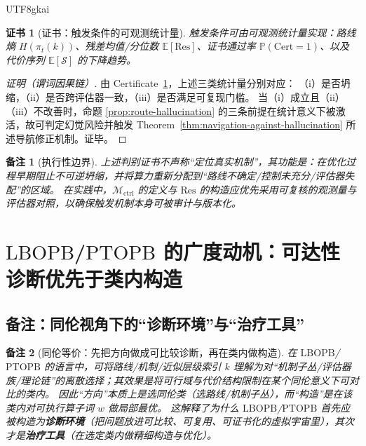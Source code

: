 \documentclass[12pt]{article}
\newtheorem{remark}{备注}[section]
\newtheorem{certificate}{证书}[section]
\newcommand{\LBOPB}{\ensuremath{\mathrm{LBOPB}}}
\newcommand{\PTOPB}{\ensuremath{\mathrm{PTOPB}}}
\begin{document}
\begin{CJK*}{UTF8}{gkai}
\begin{certificate}[证书：触发条件的可观测统计量]
\label{cert:hallucination-trigger}
触发条件可由可观测统计量实现：路线熵 $H(\pi_t(k))$、残差均值/分位数 $\mathbb{E}[\mathrm{Res}]$、证书通过率 $\mathbb{P}(\mathrm{Cert}=1)$、以及代价序列
  $\mathbb{E}[\mathcal{S}]$ 的下降趋势。
\end{certificate}

\begin{proof}[证明（谓词因果链）]
由 Certificate~\ref{cert:hallucination-trigger}，上述三类统计量分别对应：
（i）是否坍缩，（ii）是否跨评估器一致，（iii）是否满足可复现门槛。
当（i）成立且（ii）（iii）不改善时，命题 \ref{prop:route-hallucination} 的三条前提在统计意义下被激活，故可判定幻觉风险并触发 Theorem~\ref{thm:navigation-against-hallucination} 所述导航修正机制。证毕。
\end{proof}

\begin{remark}[执行性边界]
上述判别证书不声称“定位真实机制”，其功能是：在优化过程早期阻止不可逆坍缩，并将算力重新分配到“路线不确定/控制未充分/评估器失配”的区域。
在实践中，$\mathcal{M}_{\mathrm{ctrl}}$ 的定义与 $\mathrm{Res}$ 的构造应优先采用可复核的观测量与评估器对照，以确保触发机制本身可被审计与版本化。
\end{remark}

\clearpage
\section{\LBOPB/\PTOPB{} 的广度动机：可达性诊断优先于类内构造}
\label{sec:breadth-as-diagnosis}

\subsection{备注：同伦视角下的“诊断环境”与“治疗工具”}

\begin{remark}[同伦等价：先把方向做成可比较诊断，再在类内做构造]
在 \LBOPB/\PTOPB{} 的语言中，可将路线/机制/近似层级索引 $k$ 理解为对“机制子丛/评估器族/理论链”的离散选择；其效果是将可行域与代价结构限制在某个同伦意义下可对比的类内。
因此“方向”本质上是选同伦类（选路线/机制子丛），而“构造”是在该类内对可执行算子词 $w$ 做局部最优。
这解释了为什么 \LBOPB/\PTOPB{} 首先应被构造为\textbf{诊断环境}（把问题放进可比较、可复用、可证书化的虚拟宇宙里），其次才是\textbf{治疗工具}（在选定类内做精细构造与优化）。
\end{remark}


\end{CJK*}
\end{document}
